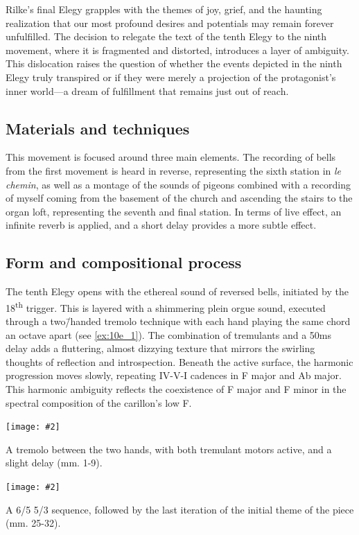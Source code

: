 \documentclass[12pt,twoside,maitrise]{dms_ks}
\newcommand{\customincludeexamples}[4][]{%
    \begin{example}[H]
        \centering
        \texttt{[image: \#2]}
        \caption{#4}
	\label{#3} 
    \end{example}
}
\theoremstyle{definition}
\begin{document}
{Rilke’s final Elegy grapples with the themes of joy, grief, and the haunting realization that our most profound desires and potentials may remain forever unfulfilled. 
The decision to relegate the text of the tenth Elegy to the ninth movement, where it is fragmented and distorted, introduces a layer of ambiguity. 
This dislocation raises the question of whether the events depicted in the ninth Elegy truly transpired or if they were merely a projection of the protagonist's inner world---a dream of fulfillment that remains just out of reach.

\subsection{Materials and techniques}

This movement is focused around three main elements.
The recording of bells from the first movement is heard in reverse, representing the sixth station in \textit{le chemin}, as well as a montage of the sounds of pigeons combined with a recording of myself coming from the basement of the church and ascending the stairs to the organ loft, representing the seventh  and final station. 
In terms of live effect, an infinite reverb is applied, and a short delay provides a more subtle effect.

\subsection{Form and compositional process}

The tenth Elegy opens with the ethereal sound of reversed bells, initiated by the 18\textsuperscript{th} trigger. 
This is layered with a shimmering plein orgue sound, executed through a two\=/handed tremolo technique with each hand playing the same chord an octave apart (see \cref{ex:10e_1}). 
The combination of tremulants and a 50ms delay adds a fluttering, almost dizzying texture that mirrors the swirling thoughts of reflection and introspection. 
Beneath the active surface, the harmonic progression moves slowly, repeating IV-V-I cadences in F major and Ab major. 
This harmonic ambiguity reflects the coexistence of F major and F minor in the spectral composition of the carillon's low F.

\customincludeexamples[width=\textwidth]{10e_1}{ex:10e_1}{A tremolo between the two hands, with both tremulant motors active, and a slight delay (mm. 1-9).}

\customincludeexamples[width=\textwidth]{10e_2}{ex:10e_2}{A 6/5 5/3 sequence, followed by the last iteration of the initial theme of the piece (mm. 25-32).}

}
\end{document}
